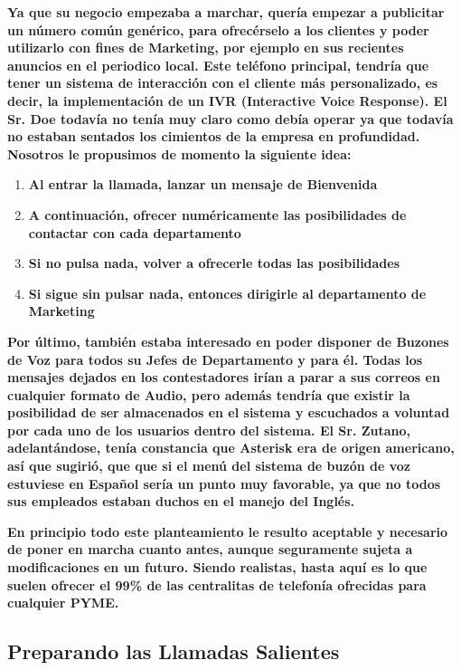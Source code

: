 \textbf{Ya que su negocio empezaba a marchar, quería empezar a publicitar un número común genérico, para ofrecérselo a los clientes y poder utilizarlo con fines de Marketing, por ejemplo en sus recientes anuncios en el periodico local. Este teléfono principal, tendría que tener un sistema de interacción con el cliente más personalizado, es decir, la implementación de un IVR (Interactive Voice Response). El Sr. Doe todavía no tenía muy claro como debía operar ya que todavía no estaban sentados los cimientos de la empresa en profundidad. Nosotros le propusimos de momento la siguiente idea:}

\begin{enumerate}

\item \textbf{Al entrar la llamada, lanzar un mensaje de Bienvenida}
\item \textbf{A continuación, ofrecer numéricamente las posibilidades de contactar con cada departamento}
\item \textbf{Si no pulsa nada, volver a ofrecerle todas las posibilidades}
\item \textbf{Si sigue sin pulsar nada, entonces dirigirle al departamento de Marketing}

\end{enumerate}

\textbf{Por último, también estaba interesado en poder disponer de Buzones de Voz para todos su Jefes de Departamento y para él. Todas los mensajes dejados en los contestadores irían a parar a sus correos en cualquier formato de Audio, pero además tendría que existir la posibilidad de ser almacenados en el sistema y escuchados a voluntad por cada uno de los usuarios dentro del sistema. El Sr. Zutano, adelantándose, tenía constancia que Asterisk era de origen americano, así que sugirió, que que si el menú del sistema de buzón de voz estuviese en Español sería un punto muy favorable, ya que no todos sus empleados estaban duchos en el manejo del Inglés.}

\textbf{En principio todo este planteamiento le resulto aceptable y necesario de poner en marcha cuanto antes, aunque seguramente sujeta a modificaciones en un futuro. Siendo realistas, hasta aquí es lo que suelen ofrecer el 99\% de las centralitas de telefonía ofrecidas para cualquier PYME.}

\subsection{Preparando las Llamadas Salientes}

